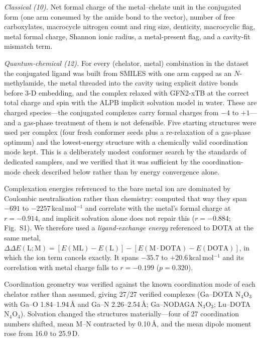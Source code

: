 \emph{Classical (10).} Net formal charge of the metal--chelate unit in the conjugated form (one arm consumed by the amide bond to the vector), number of free carboxylates, macrocycle nitrogen count and ring size, denticity, macrocyclic flag, metal formal charge, Shannon ionic radius, a metal-present flag, and a cavity-fit mismatch term.

\emph{Quantum-chemical (12).} For every (chelator, metal) combination in the dataset the conjugated ligand was built from SMILES with one arm capped as an $N$-methylamide, the metal threaded into the cavity using explicit dative bonds before 3-D embedding, and the complex relaxed with GFN2-xTB\cite{Bannwarth2019,Bannwarth2020} at the correct total charge and spin with the ALPB implicit solvation model\cite{Ehlert2021ALPB} in water. These are charged species---the conjugated complexes carry formal charges from $-4$ to $+1$---and a gas-phase treatment of them is not defensible. Five starting structures were used per complex (four fresh conformer seeds plus a re-relaxation of a gas-phase optimum) and the lowest-energy structure with a chemically valid coordination mode kept. This is a deliberately modest conformer search by the standards of dedicated samplers,\cite{Pracht2024CREST} and we verified that it was sufficient by the coordination-mode check described below rather than by energy convergence alone.

Complexation energies referenced to the bare metal ion are dominated by Coulombic neutralisation rather than chemistry: computed that way they span $-691$ to $-2257$\,kcal\,mol$^{-1}$ and correlate with the metal's formal charge at $r = -0.914$, and implicit solvation alone does not repair this ($r = -0.884$; Fig.~S1). We therefore used a \emph{ligand-exchange energy} referenced to DOTA at the same metal, $\Delta\Delta E(\mathrm{L};\mathrm{M}) = [E(\mathrm{ML}) - E(\mathrm{L})] - [E(\mathrm{M}\cdot\mathrm{DOTA}) - E(\mathrm{DOTA})]$, in which the ion term cancels exactly. It spans $-35.7$ to $+20.6$\,kcal\,mol$^{-1}$ and its correlation with metal charge falls to $r = -0.199$ ($p = 0.320$).

Coordination geometry was verified against the known coordination mode of each chelator rather than assumed, giving 27/27 verified complexes (Ga--DOTA N$_4$O$_3$ with Ga--O 1.84--1.94\,\AA{} and Ga--N 2.26--2.54\,\AA; Ga--NODAGA N$_3$O$_3$; Lu--DOTA N$_4$O$_4$). Solvation changed the structures materially---four of 27 coordination numbers shifted, mean M--N contracted by 0.10\,\AA, and the mean dipole moment rose from 16.0 to 25.9\,D.


